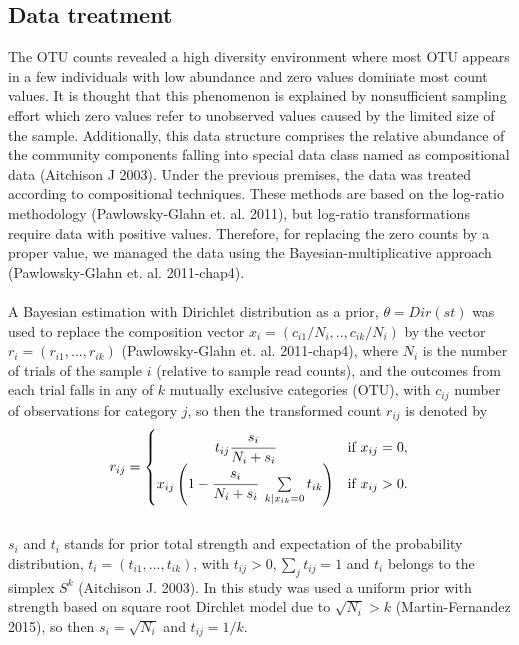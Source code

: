 \documentclass[10pt,letterpaper]{article}
\begin{document}
\subsection*{Data treatment}
The OTU counts revealed a high diversity environment where most OTU appears in a few individuals with low abundance and zero values dominate most count values. It is thought that this phenomenon is explained by nonsufficient sampling effort which zero values refer to unobserved values caused by the limited size of the sample. 
Additionally, this data structure comprises the relative abundance of the community components falling into special data class named as compositional data (Aitchison J 2003). Under the previous premises, the data was treated according to compositional techniques. These methods are based on the log-ratio methodology  (Pawlowsky-Glahn et. al. 2011), but log-ratio transformations require data with positive values. Therefore, for replacing the zero counts by a proper value, we managed the data using the Bayesian-multiplicative approach (Pawlowsky-Glahn et. al. 2011-chap4).
\\\\
A Bayesian estimation with Dirichlet distribution as a prior, $\theta=Dir(st)$ was used to replace the composition vector $x_{i}=(c_{i1}/N_{i},..,c_{ik}/N_{i})$ by the vector $r_{i}=(r_{i1},...,r_{ik})$ (Pawlowsky-Glahn et. al. 2011-chap4), where $N_{i}$ is the number of trials of the sample $i$ (relative to sample read counts), and the outcomes from each trial falls in any of  $k$ mutually exclusive categories (OTU), with $c_{ij}$ number of observations for category $j$, so then the transformed count $r_{ij}$ is denoted by
\\
\begin{equation}
r_{ij}=\begin{cases}
	\hfil t_{ij}\cfrac{s_{i}}{N_{i}+s_{i}} & \text{if } x_{ij}=0,\\
	x_{ij} \left( 1-\cfrac{s_{i}}{N_{i}+s_{i}}~\sum\limits_{k|x_{ik}=0} t_{ik}	\right) & \text{if } x_{ij}>0.
	\end{cases}	
\end{equation}
\\
$s_{i}$ and $t_{i}$ stands for prior total strength and expectation of the probability distribution, $t_{i}=(t_{i1},...,t_{ik})$, with $t_{ij} >0, \sum_{j}t_{ij} =1$ and $t_{i}$ belongs to the simplex $S^k$ (Aitchison J. 2003). In this study was used a uniform prior with strength based on square root Dirchlet model due to  $\sqrt{N_{i}} > k$ (Martin-Fernandez 2015), so then $s_{i}=\sqrt{N_{i}}$ and $t_{ij}=1/k$.
\\
\end{document}
